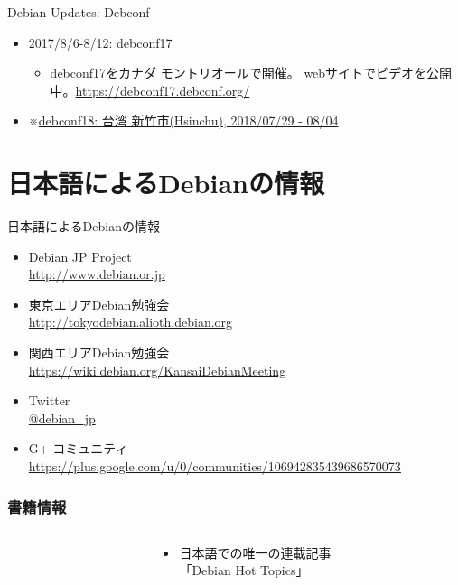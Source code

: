 \documentclass[cjk,c,squeeze,shrink,dvipdfmx,12pt]{beamer}
\begin{document}
\begin{frame}[fragile]{Debian Updates: Debconf}%
  \begin{itemize}[<+->]
  \item 2017/8/6-8/12:  debconf17
    \begin{itemize}
    \item
      debconf17をカナダ モントリオールで開催。
      webサイトでビデオを公開中。\url{https://debconf17.debconf.org/}
      \newline
    \end{itemize}
  \item
    ※\uline{debconf18: 台湾 新竹市(Hsinchu), 2018/07/29 - 08/04}
  \end{itemize}
\end{frame}

\section{日本語によるDebianの情報}

\begin{frame}[fragile]{日本語によるDebianの情報}
  \begin{itemize}
  \item Debian JP Project \\
    \url{http://www.debian.or.jp}
  \item 東京エリアDebian勉強会\\
    \url{http://tokyodebian.alioth.debian.org}
  \item 関西エリアDebian勉強会 \\
    \url{https://wiki.debian.org/KansaiDebianMeeting}
  \item Twitter \\
    \url{@debian_jp}
  \item G+ コミュニティ \\
    \url{https://plus.google.com/u/0/communities/106942835439686570073}
  \end{itemize}
\end{frame}

\begin{frame}
  \frametitle{書籍情報}
  \begin{columns}
    \begin{column}{.5\paperwidth}
      \centering
    \end{column}
    \begin{column}{.5\paperwidth}
      \begin{itemize}
      \item %
        日本語での唯一の連載記事 \\
        「Debian Hot Topics」
      \end{itemize}
    \end{column}
  \end{columns}
\end{frame}
\end{document}
